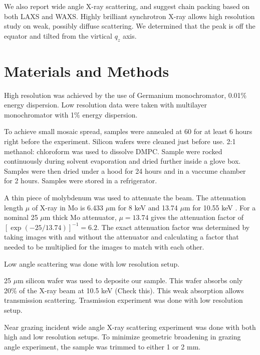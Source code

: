 We also report wide
angle X-ray scattering, and suggest chain packing based on both LAXS and WAXS.
Highly brilliant synchrotron X-ray allows high resolution study on 
weak, possibly diffuse scattering.  We determined that the peak is off the 
equator and tilted from the virtical $q_z$ axis.

\section{Materials and Methods}
High resolution was achieved by the use of Germanium monochromator, 0.01\% 
energy dispersion. Low resolution data were taken with multilayer 
monochromator with 1\% energy dispersion.

To achieve small mosaic spread, samples were annealed at 60 \textcelsius for
at least 6 hours right before the experiment. Silicon wafers were cleaned
just before use. 2:1 methanol: chloroform was used to dissolve DMPC.
Sample were rocked continuously during solvent evaporation and dried further
inside a glove box. Samples were then dried under a hood for 24 hours 
and in a vaccume chamber for 2 hours. Samples were stored in a refrigerator.

A thin piece of molybdenum was used to attenuate the beam. The attenuation length
$\mu$ of X-ray in Mo is 6.433 $\mu$m for 8 keV and 13.74 $\mu$m for 10.55 keV 
\cite{ref:cxro}.
For a nominal 25 $\mu$m thick Mo attenuator, $\mu=13.74$ gives the attenuation factor 
of $[\exp(-25/13.74)]^{-1} = 6.2$. The exact attenuation factor was determined
by taking images with and without the attenuator and calculating a factor
that needed to be multiplied for the images to match with each other.

Low angle scattering was done with low resolution setup.

25 $\mu$m silicon wafer was used to deposite our sample. This wafer absorbs
only 20\% of the X-ray beam at 10.5 keV (Check this). This weak absorption
allows transmission scattering. Trasmission experiment was done with
low resolution setup.

Near grazing incident wide angle X-ray scattering experiment was done 
with both high and low resolution setups.
To minimize geometric broadening in grazing angle experiment, the sample
was trimmed to either 1 or 2 mm. 

